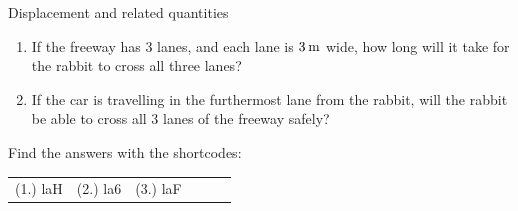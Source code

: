 \begin{exercises}{Displacement and related quantities }
\begin{enumerate}[noitemsep, label=\textbf{\arabic*}. ]
\begin{enumerate}[noitemsep, label=\textbf{\alph*}. ]
\label{m38791*uid55}\item If the freeway has 3 lanes, and each lane is $3\phantom{\rule{2pt}{0ex}}\text{m}$ wide, how long will it take for the rabbit to cross all three lanes?
\label{m38791*uid56}\item If the car is travelling in the furthermost lane from the rabbit, will the rabbit be able to cross all 3 lanes of the freeway safely?
\end{enumerate}
                \end{enumerate}
\label{m38791*secfhsst!!!underscore!!!id1289}
\par {} Find the answers with the shortcodes:
 \par \begin{tabular}[h]{cccccc}
 (1.) laH  &  (2.) la6  &  (3.) laF  & \end{tabular}
\end{exercises} \pagebreak
